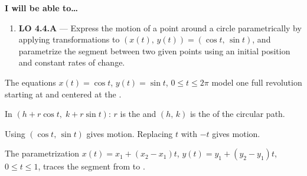 \documentclass[10pt]{article}
\begin{document}
\namedateperiod

\vspace{0.08in}

\begin{objectivebox}
\textbf{I will be able to\ldots}
\begin{enumerate}[leftmargin=1.5em, itemsep=4pt]
  \item \textbf{LO 4.4.A} --- Express the motion of a point around a
    circle parametrically by applying transformations to
    $(x(t),\,y(t)) = (\cos t,\,\sin t)$, and parametrize the segment
    between two given points using an initial position and constant
    rates of change. 
\end{enumerate}
\end{objectivebox}

\vspace{0.08in}

\begin{vocabbox}
\begin{description}[leftmargin=0pt, itemsep=6pt]
  \item[\termblanklong{unit circle parametrization}]
    The equations $x(t) = \cos t$, $y(t) = \sin t$, $0 \le t \le 2\pi$
    model one full  revolution starting at
     and centered at the .

  \item[\termblanklong{radius / center}]
    In $(h + r\cos t,\; k + r\sin t)$: $r$ is the
     and $(h,\,k)$ is the
     of the circular path.

  \item[\termblanklong{orientation}]
    Using $(\cos t,\,\sin t)$ gives  motion.
    Replacing $t$ with $-t$ gives  motion.

  \item[\termblanklong{linear parametrization}]
    The parametrization $x(t) = x_1 + (x_2-x_1)t$,
    $y(t) = y_1 + (y_2-y_1)t$, $0\le t\le 1$, traces the segment from
     to .
\end{description}
\end{vocabbox}
\end{document}
